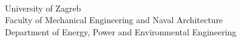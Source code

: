 \documentclass[b1b,portrait]{b0poster}
\begin{document}


\begin{minipage}[t][7cm][c]{0.3\linewidth}
\centering
{}\hspace{1cm}
\\[0.35cm]
{\small
University of Zagreb\\
Faculty of Mechanical Engineering and Naval Architecture\\
Department of Energy, Power and Environmental Engineering%
}
\end{minipage}%
%


\vspace{1.6cm}
\end{document}
